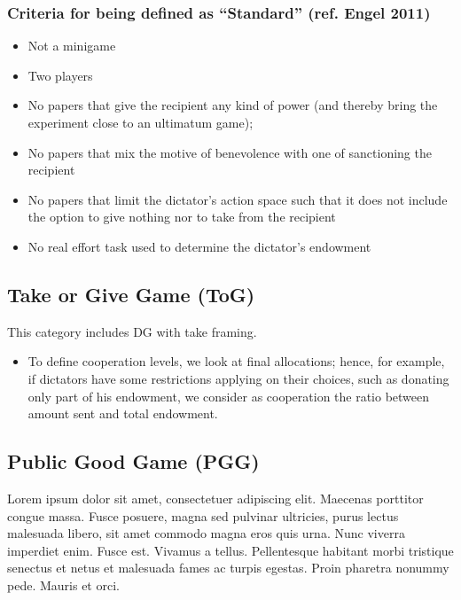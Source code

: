 \documentclass[
]{article}
\providecommand{\tightlist}{%
  \setlength{\itemsep}{0pt}\setlength{\parskip}{0pt}}
\begin{document}
\hypertarget{criteria-for-being-defined-as-standard-ref.-engel-2011}{%
\subsubsection{Criteria for being defined as ``Standard'' (ref. Engel
2011)}\label{criteria-for-being-defined-as-standard-ref.-engel-2011}}

\begin{itemize}
\tightlist
\item
  Not a minigame
\item
  Two players
\item
  No papers that give the recipient any kind of power (and thereby bring
  the experiment close to an ultimatum game);
\item
  No papers that mix the motive of benevolence with one of sanctioning
  the recipient
\item
  No papers that limit the dictator's action space such that it does not
  include the option to give nothing nor to take from the recipient
\item
  No real effort task used to determine the dictator's endowment
\end{itemize}

\hypertarget{take-or-give-game-tog}{%
\subsection{Take or Give Game (ToG)}\label{take-or-give-game-tog}}

This category includes DG with take framing.

\begin{itemize}
\tightlist
\item
  To define cooperation levels, we look at final allocations; hence, for
  example, if dictators have some restrictions applying on their
  choices, such as donating only part of his endowment, we consider as
  cooperation the ratio between amount sent and total endowment.
\end{itemize}

\hypertarget{public-good-game-pgg}{%
\subsection{Public Good Game (PGG)}\label{public-good-game-pgg}}

Lorem ipsum dolor sit amet, consectetuer adipiscing elit. Maecenas
porttitor congue massa. Fusce posuere, magna sed pulvinar ultricies,
purus lectus malesuada libero, sit amet commodo magna eros quis urna.
Nunc viverra imperdiet enim. Fusce est. Vivamus a tellus. Pellentesque
habitant morbi tristique senectus et netus et malesuada fames ac turpis
egestas. Proin pharetra nonummy pede. Mauris et orci.
\end{document}
